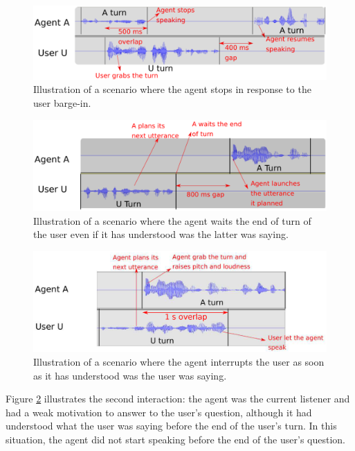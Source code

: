 \begin{figure}
\centering
\includegraphics[width=\linewidth]{figure/volume_transcript_1_2_refait.eps}
\caption{Illustration of a scenario where the agent stops in response to the user barge-in.}
\label{sc_2}
\end{figure}

\begin{figure}
\centering
\includegraphics[width=\linewidth]{figure/volume_transcript_2_2_refait.eps}
\caption{Illustration of a scenario where the agent waits the end of turn of the user even if it has understood was the latter was saying.}
\label{sc_3}
\end{figure}

\begin{figure}
\centering
\includegraphics[width=\linewidth]{figure/volume_transcript_2_1_refait.eps}
\caption{Illustration of a scenario where the agent interrupts the user as soon as it has understood was the user was saying.}
\label{sc_4}
\end{figure}

Figure \ref{sc_3} illustrates the second interaction: the agent was the current listener and had a weak motivation to answer to the user's question, although it had understood what the user was saying before the end of the user's turn. In this situation, the agent did not start speaking before the end of the user's question. 


